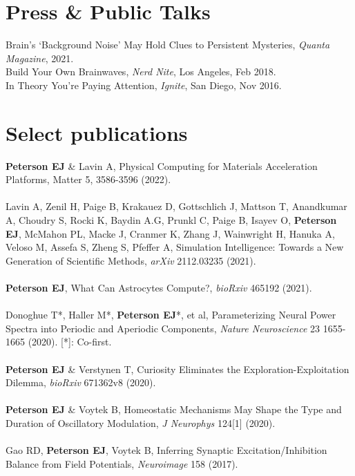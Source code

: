 \documentclass[margin,line]{res}
\begin{document}
\begin{resume}
\vspace{-.2cm}
\section{\sc Press \& Public Talks}
Brain's `Background Noise' May Hold Clues to Persistent Mysteries, \emph{Quanta Magazine}, 2021. \\
Build Your Own Brainwaves, \emph{Nerd Nite}, Los Angeles, Feb 2018. \\
In Theory You're Paying Attention, \emph{Ignite}, San Diego, Nov 2016. \\
    
\vspace{-.5cm} 
\section{\sc Select publications}

\textbf{Peterson EJ} \& Lavin A, Physical Computing for Materials Acceleration Platforms, Matter 5, 3586-3596 (2022).
\\ 
\vspace{-.35cm} 
\\
Lavin A, Zenil H, Paige B, Krakauez D, Gottschlich J, Mattson T, Anandkumar A, Choudry S, Rocki K, Baydin A.G, Prunkl C, Paige B, Isayev O, \textbf{Peterson EJ}, McMahon PL, Macke J, Cranmer K, Zhang J, Wainwright H, Hanuka A, Veloso M, Assefa S, Zheng S, Pfeffer A, Simulation Intelligence: Towards a New Generation of Scientific Methods, \emph{arXiv} 2112.03235 (2021).
\\ 
\vspace{-.35cm} 
\\
\textbf{Peterson EJ}, What Can Astrocytes Compute?, \emph{bioRxiv} 465192 (2021).
\\ 
\vspace{-.35cm} 
\\
Donoghue T*, Haller M*, \textbf{Peterson EJ}*, et al, Parameterizing Neural Power Spectra into Periodic and Aperiodic Components, \emph{Nature Neuroscience} 23 1655-1665 (2020). [*]: Co-first. 
\\ 
\vspace{-.35cm} 
\\
\textbf{Peterson EJ} \& Verstynen T, Curiosity Eliminates the Exploration-Exploitation Dilemma, \emph{bioRxiv} 671362v8 (2020). 
\\ 
\vspace{-.35cm} 
\\
\textbf{Peterson EJ} \& Voytek B, Homeostatic Mechanisms May Shape the Type and Duration of Oscillatory Modulation, \emph{J Neurophys} 124[1] (2020).
\\ 
\vspace{-.35cm} 
\\
Gao RD, \textbf{Peterson EJ}, Voytek B, Inferring Synaptic Excitation/Inhibition Balance from Field Potentials, \emph{Neuroimage} 158 (2017).


\end{resume}
\end{document}
